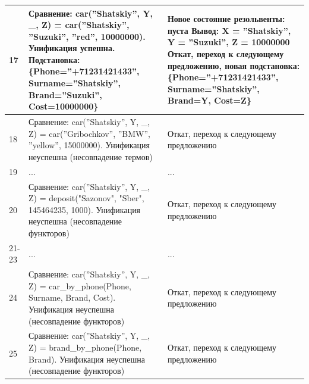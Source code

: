 \documentclass[12pt]{report}
\begin{document}
\begin{table}[H]
	\begin{center}
		\begin{tabular}{|p{1 cm}|p{11 cm}|p{7 cm}|}
			\hline
			17 & Сравнение: \newline car(''Shatskiy'', Y, \_, Z) = \newline car(''Shatskiy'', ''Suzuki'', ''red'', 10000000). \newline Унификация успешна. \newline Подстановка: \{Phone=''+71231421433'', Surname=''Shatskiy'', Brand=''Suzuki'', Cost=10000000\} & Новое состояние резольвенты: пуста \newline Вывод: \newline X = ''Shatskiy'', Y = ''Suzuki'', Z = 10000000 \newline Откат, переход к следующему предложению, новая подстановка: \{Phone=''+71231421433'', Surname=''Shatskiy'', Brand=Y, Cost=Z\} \\
			\hline
			18 & Сравнение: \newline car(''Shatskiy'', Y, \_, Z) = \newline car(''Gribochkov'', ''BMW'', ''yellow'', 15000000). \newline Унификация неуспешна (несовпадение термов) & Откат, переход к следующему предложению \\
			\hline
			19 & ... & ... \\
			\hline
			20 & Сравнение: \newline car(''Shatskiy'', Y, \_, Z) = \newline deposit("Sazonov", "Sber", 145464235, 1000). \newline Унификация неуспешна (несовпадение функторов) & Откат, переход к следующему предложению \\
			\hline
			21-23 & ... & ... \\
			\hline
			24 & Сравнение: \newline car(''Shatskiy'', Y, \_, Z) = \newline car\_by\_phone(Phone, Surname, Brand, Cost). \newline Унификация неуспешна (несовпадение функторов) & Откат, переход к следующему предложению \\
			\hline
			25 & Сравнение: \newline car(''Shatskiy'', Y, \_, Z) = \newline brand\_by\_phone(Phone, Brand). \newline Унификация неуспешна (несовпадение функторов) & Откат, переход к следующему предложению \\

\end{tabular}
\end{center}
\end{table}
\end{document}
